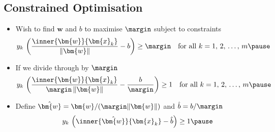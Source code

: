 \begin{slide}
\section[-1]{Constrained Optimisation}

\begin{PauseHighLight}
  \begin{itemize}
  \item Wish to find $\bm{w}$ and $b$ to maximise $\margin$ subject to
    constraints
    \begin{align*}
      y_k\,\left(\frac{\inner{\bm{w}}{\bm{x}_k}}{\| \bm{w} \|} - b\right)
      \geq \margin
      \quad \mbox{for all $k=1,\,2,\,\ldots,\,m$}\pause
    \end{align*}
  \item If we divide through by $\margin$
    \begin{align*}
       y_k\,\left(\frac{\inner{\bm{w}}{\bm{x}_k}}{\margin\, \| \bm{w} \|} -
      \frac{b}{\margin}\right) \geq 1
      \quad \mbox{for all $k=1,\,2,\,\ldots,\,m$}\pause
    \end{align*}
  \item Define $\hat{\bm{w}}=\bm{w}/(\margin\|\bm{w}\|)$ and
    $\hat{b}=b/\margin$
    \begin{align*}
       y_k\,\left(\inner{\hat{\bm{w}}}{\bm{x}_k} - \hat{b}\right) \geq 1\pause
    \end{align*}
  \end{itemize}
\end{PauseHighLight}

\end{slide}


